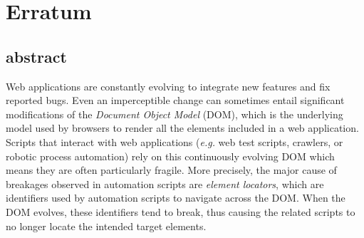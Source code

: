 \chapter{Erratum}
\section{abstract}

Web applications are constantly evolving to integrate new features and fix reported bugs.
Even an imperceptible change can sometimes entail significant modifications of the \emph{Document Object Model} (DOM), which is the underlying model used by browsers to render all the elements included in a web application.
Scripts that interact with web applications (\emph{e.g.} web test scripts, crawlers, or robotic process automation) rely on this continuously evolving DOM which means they are often particularly fragile.
More precisely, the major cause of breakages observed in automation scripts are \emph{element locators}, which are identifiers used by automation scripts to navigate across the DOM. When the DOM evolves, these identifiers tend to break, thus causing the related scripts to no longer locate the intended target elements.

